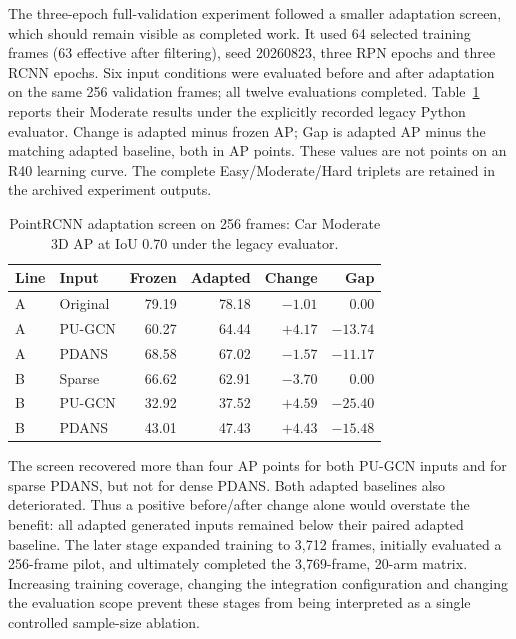 The three-epoch full-validation experiment followed a smaller adaptation screen, which should
remain visible as completed work. It used 64 selected training frames
(63 effective after filtering), seed 20260823, three RPN epochs and
three RCNN epochs. Six input conditions were evaluated before and after
adaptation on the same 256 validation frames; all twelve evaluations
completed. Table~\ref{tab:k-screen} reports their Moderate results under
the explicitly recorded legacy Python evaluator. Change is adapted
minus frozen AP; Gap is adapted AP minus the matching adapted baseline,
both in AP points. These values are not points on an R40 learning curve.
The complete Easy/Moderate/Hard triplets are retained in the archived
experiment outputs.

\begin{table}[!t]\centering\setlength{\tabcolsep}{4pt}
\begin{tabular}{llrrrr}\toprule
Line & Input & Frozen & Adapted & Change & Gap\\\midrule
A & Original & 79.19 & 78.18 & $-1.01$ & 0.00\\
A & PU-GCN & 60.27 & 64.44 & $+4.17$ & $-13.74$\\
A & PDANS & 68.58 & 67.02 & $-1.57$ & $-11.17$\\
B & Sparse & 66.62 & 62.91 & $-3.70$ & 0.00\\
B & PU-GCN & 32.92 & 37.52 & $+4.59$ & $-25.40$\\
B & PDANS & 43.01 & 47.43 & $+4.43$ & $-15.48$\\\bottomrule
\end{tabular}
\caption{PointRCNN adaptation screen on 256 frames: Car Moderate 3D AP
at IoU 0.70 under the legacy evaluator.}\label{tab:k-screen}
\end{table}

The screen recovered more than four AP points for both PU-GCN inputs
and for sparse PDANS, but not for dense PDANS. Both adapted baselines
also deteriorated. Thus a positive before/after change alone would
overstate the benefit: all adapted generated inputs remained below
their paired adapted baseline. The later stage expanded training to
3,712 frames, initially evaluated a 256-frame pilot, and ultimately
completed the 3,769-frame, 20-arm matrix. Increasing training coverage,
changing the integration configuration and changing the evaluation
scope prevent these stages from being interpreted as a single
controlled sample-size ablation.
